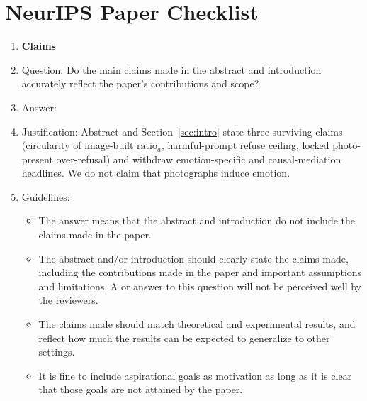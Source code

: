 
\section*{NeurIPS Paper Checklist}

\begin{enumerate}

\item {\bf Claims}
\item[] Question: Do the main claims made in the abstract and introduction accurately reflect the paper's contributions and scope?
\item[] Answer: \answerYes{}
\item[] Justification: Abstract and Section~\ref{sec:intro} state three surviving claims (circularity of image-built $\mathrm{ratio}_a$, harmful-prompt refuse ceiling, locked photo-present over-refusal) and withdraw emotion-specific and causal-mediation headlines. We do not claim that photographs induce emotion.
\item[] Guidelines:
\begin{itemize}
\item The answer \answerNA{} means that the abstract and introduction do not include the claims made in the paper.
\item The abstract and/or introduction should clearly state the claims made, including the contributions made in the paper and important assumptions and limitations. A \answerNo{} or \answerNA{} answer to this question will not be perceived well by the reviewers.
\item The claims made should match theoretical and experimental results, and reflect how much the results can be expected to generalize to other settings.
\item It is fine to include aspirational goals as motivation as long as it is clear that those goals are not attained by the paper.
\end{itemize}


\end{enumerate}
